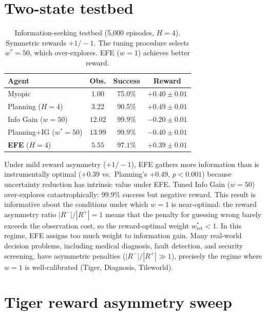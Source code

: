 \documentclass[runningheads]{llncs}
\begin{document}
\section{Two-state testbed}
\label{app:testbed}

\begin{table}[h]
\centering
\caption{Information-seeking testbed (5{,}000 episodes, $H{=}4$). Symmetric rewards $+1 / {-}1$. The tuning procedure selects $w^*{=}50$, which over-explores. EFE ($w{=}1$) achieves better reward.}
\begin{small}
\begin{tabular}{lccc}
\toprule
Agent & Obs. & Success & Reward \\
\midrule
Myopic & $1.00$ & 75.0\% & $+0.40 \pm 0.01$ \\
Planning ($H{=}4$) & $3.22$ & 90.5\% & $\mathbf{+0.49 \pm 0.01}$ \\
Info Gain ($w{=}50$) & $12.02$ & 99.9\% & $-0.20 \pm 0.01$ \\
Planning+IG ($w^*{=}50$) & $13.99$ & 99.9\% & $-0.40 \pm 0.01$ \\
\textbf{EFE} ($H{=}4$) & $5.55$ & $\mathbf{97.1\%}$ & $+0.39 \pm 0.01$ \\
\bottomrule
\end{tabular}
\end{small}
\end{table}

Under mild reward asymmetry ($+1 / {-}1$), EFE gathers more information than is instrumentally optimal ($+0.39$ vs.\ Planning's $+0.49$, $p < 0.001$) because uncertainty reduction has intrinsic value under EFE. Tuned Info Gain ($w{=}50$) over-explores catastrophically: 99.9\% success but negative reward. This result is informative about the conditions under which $w{=}1$ is near-optimal: the reward asymmetry ratio $|R^-|/|R^+| = 1$ means that the penalty for guessing wrong barely exceeds the observation cost, so the reward-optimal weight $w^*_{\text{ret}} < 1$. In this regime, EFE assigns too much weight to information gain. Many real-world decision problems, including medical diagnosis, fault detection, and security screening, have asymmetric penalties ($|R^-|/|R^+| \gg 1$), precisely the regime where $w{=}1$ is well-calibrated (Tiger, Diagnosis, Tileworld).

\section{Tiger reward asymmetry sweep}
\label{app:tiger_sweep}
\end{document}
